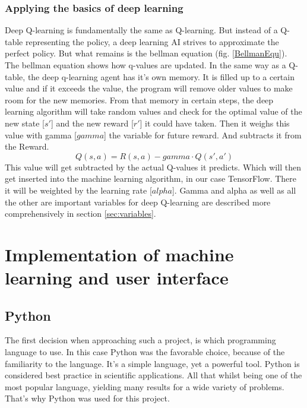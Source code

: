 \documentclass[12pt]{article}
\def\alpha{alpha}%
\def\gamma{gamma}%
\begin{document}
\subsubsection{Applying the basics of deep learning}
Deep Q-learning is fundamentally the same as Q-learning. But instead of a Q-table representing the policy, a deep learning AI strives to approximate the perfect policy. But what remains is the bellman equation (fig. \ref{BellmanEqu}). The bellman equation shows how q-values are updated. In the same way as a Q-table, the deep q-learning agent has it's own memory. It is filled up to a certain value and if it exceeds the value, the program will remove older values to make room for the new memories. From that memory in certain steps, the deep learning algorithm will take random values and check for the optimal value of the new state [$s'$] and the new reward [$r'$] it could have taken. Then it weighs this value with gamma [$\gamma$] the variable for future reward. And subtracts it from the Reward. \cite{bellmanEquValue}
\[Q(s,a) = R(s,a) - \gamma\cdot Q(s',a')\]
This value will get subtracted by the actual Q-values it predicts. Which will then get inserted into the machine learning algorithm, in our case TensorFlow. There it will be weighted by the learning rate [$\alpha$]. Gamma and alpha as well as all the other are important variables for deep Q-learning are described more comprehensively in section \ref{sec:variables}.

\section{Implementation of machine learning and user interface}
\subsection{Python}
The first decision when approaching such a project, is which programming language to use. In this case Python was the favorable choice, because of the familiarity to the language. It's a simple language, yet a powerful tool. Python is considered best practice in scientific applications. All that whilst being one of the most popular language, yielding many results for a wide variety of problems. That's why Python was used for this project. \cite{Python} 
\end{document}
